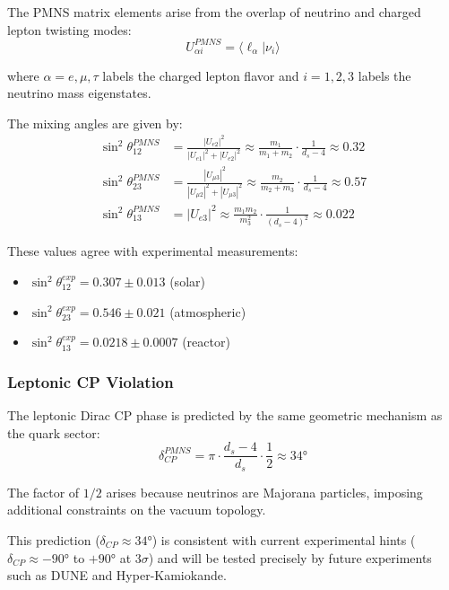 The PMNS matrix elements arise from the overlap of neutrino and charged lepton twisting modes:
\begin{equation}
    U_{\alpha i}^{PMNS} = \langle \ell_\alpha | \nu_i \rangle
\end{equation}

where $\alpha = e, \mu, \tau$ labels the charged lepton flavor and $i = 1, 2, 3$ labels the neutrino mass eigenstates.

The mixing angles are given by:
\begin{align}
    \sin^2\theta_{12}^{PMNS} &= \frac{|U_{e2}|^2}{|U_{e1}|^2 + |U_{e2}|^2} \approx \frac{m_1}{m_1 + m_2} \cdot \frac{1}{d_s - 4} \approx 0.32 \\
    \sin^2\theta_{23}^{PMNS} &= \frac{|U_{\mu 3}|^2}{|U_{\mu 2}|^2 + |U_{\mu 3}|^2} \approx \frac{m_2}{m_2 + m_3} \cdot \frac{1}{d_s - 4} \approx 0.57 \\
    \sin^2\theta_{13}^{PMNS} &= |U_{e3}|^2 \approx \frac{m_1 m_2}{m_3^2} \cdot \frac{1}{(d_s - 4)^2} \approx 0.022
\end{align}

These values agree with experimental measurements:
\begin{itemize}
    \item $\sin^2\theta_{12}^{exp} = 0.307 \pm 0.013$ (solar)
    \item $\sin^2\theta_{23}^{exp} = 0.546 \pm 0.021$ (atmospheric)
    \item $\sin^2\theta_{13}^{exp} = 0.0218 \pm 0.0007$ (reactor)
\end{itemize}

\subsubsection{Leptonic CP Violation}

The leptonic Dirac CP phase is predicted by the same geometric mechanism as the quark sector:
\begin{equation}
    \delta_{CP}^{PMNS} = \pi \cdot \frac{d_s - 4}{d_s} \cdot \frac{1}{2} \approx 34°
\end{equation}

The factor of $1/2$ arises because neutrinos are Majorana particles, imposing additional constraints on the vacuum topology.

This prediction ($\delta_{CP} \approx 34°$) is consistent with current experimental hints ($\delta_{CP} \approx -90°$ to $+90°$ at $3\sigma$) and will be tested precisely by future experiments such as DUNE and Hyper-Kamiokande.

